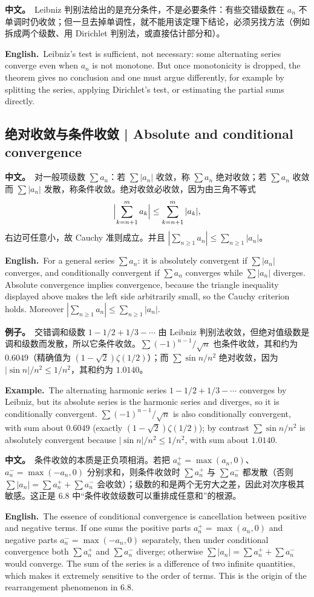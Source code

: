 \documentclass[UTF8,11pt,a4paper]{ctexart}
\newcommand{\BOTH}[2]{\par\noindent\textbf{中文。}\ #1\par\noindent\textbf{English.}\ #2\par}
\newcommand{\EX}[2]{\par\noindent\textbf{例子。}\ #1\par\noindent\textbf{Example.}\ #2\par}
\begin{document}
\BOTH{Leibniz 判别法给出的是充分条件，不是必要条件：有些交错级数在 $a_n$ 不单调时仍收敛；但一旦去掉单调性，就不能用该定理下结论，必须另找方法（例如拆成两个级数、用 Dirichlet 判别法，或直接估计部分和）。}{Leibniz's test is sufficient, not necessary: some alternating series converge even when $a_n$ is not monotone. But once monotonicity is dropped, the theorem gives no conclusion and one must argue differently, for example by splitting the series, applying Dirichlet's test, or estimating the partial sums directly.}

\subsection{绝对收敛与条件收敛 | Absolute and conditional convergence}
\BOTH{对一般项级数 $\sum a_n$：若 $\sum|a_n|$ 收敛，称 $\sum a_n$ 绝对收敛；若 $\sum a_n$ 收敛而 $\sum|a_n|$ 发散，称条件收敛。绝对收敛必收敛，因为由三角不等式
\[
\Bigl|\sum_{k=n+1}^{m}a_k\Bigr|\le\sum_{k=n+1}^{m}|a_k|,
\]
右边可任意小，故 Cauchy 准则成立。并且 $|\sum_{n\ge1}a_n|\le\sum_{n\ge1}|a_n|$。}{For a general series $\sum a_n$: it is absolutely convergent if $\sum|a_n|$ converges, and conditionally convergent if $\sum a_n$ converges while $\sum|a_n|$ diverges. Absolute convergence implies convergence, because the triangle inequality displayed above makes the left side arbitrarily small, so the Cauchy criterion holds. Moreover $|\sum_{n\ge1}a_n|\le\sum_{n\ge1}|a_n|$.}
\EX{交错调和级数 $1-1/2+1/3-\cdots$ 由 Leibniz 判别法收敛，但绝对值级数是调和级数而发散，所以它条件收敛。$\sum(-1)^{n-1}/\sqrt n$ 也条件收敛，其和约为 $0.6049$（精确值为 $(1-\sqrt2)\zeta(1/2)$）；而 $\sum\sin n/n^2$ 绝对收敛，因为 $|\sin n|/n^2\le1/n^2$，其和约为 $1.0140$。}{The alternating harmonic series $1-1/2+1/3-\cdots$ converges by Leibniz, but its absolute series is the harmonic series and diverges, so it is conditionally convergent. $\sum(-1)^{n-1}/\sqrt n$ is also conditionally convergent, with sum about $0.6049$ (exactly $(1-\sqrt2)\zeta(1/2)$); by contrast $\sum\sin n/n^2$ is absolutely convergent because $|\sin n|/n^2\le1/n^2$, with sum about $1.0140$.}
\BOTH{条件收敛的本质是正负项相消。若把 $a_n^+=\max(a_n,0)$、$a_n^-=\max(-a_n,0)$ 分别求和，则条件收敛时 $\sum a_n^+$ 与 $\sum a_n^-$ 都发散（否则 $\sum|a_n|=\sum a_n^++\sum a_n^-$ 会收敛）；级数的和是两个无穷大之差，因此对次序极其敏感。这正是 6.8 中“条件收敛级数可以重排成任意和”的根源。}{The essence of conditional convergence is cancellation between positive and negative terms. If one sums the positive parts $a_n^+=\max(a_n,0)$ and negative parts $a_n^-=\max(-a_n,0)$ separately, then under conditional convergence both $\sum a_n^+$ and $\sum a_n^-$ diverge; otherwise $\sum|a_n|=\sum a_n^++\sum a_n^-$ would converge. The sum of the series is a difference of two infinite quantities, which makes it extremely sensitive to the order of terms. This is the origin of the rearrangement phenomenon in 6.8.}
\end{document}
